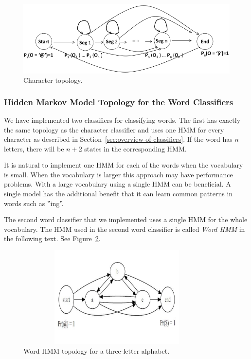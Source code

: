 \begin{figure}[h!]
\centering
\includegraphics[scale=1.1]{character-topology}
\caption{Character topology.}
\label{figure:charactertopology}
\end{figure}


\subsubsection{Hidden Markov Model Topology for the Word Classifiers}

We have implemented two classifiers for classifying words. 
The first has exactly the same topology as the character classifier and uses one HMM for every character as described in Section~\ref{sec:overview-of-classifiers}. 
If the word has $n$ letters, there will be $n + 2$ states in the corresponding HMM.

It is natural to implement one HMM for each of the words when the vocabulary is small.
When the vocabulary is larger this approach may have performance problems.
With a large vocabulary using a single HMM can be beneficial.
A single model has the additional benefit that it can learn common patterns in words such as ''ing''.

The second word classifier that we implemented uses a single HMM for the whole vocabulary. 
The HMM used in the second word classifier is called \textit{Word HMM} in the following text.
See Figure~\ref{figure:wordtopology}.

\begin{figure}[h!]
\centering
\includegraphics[width=4in,height=2in]{wordtopology}
\caption{Word HMM topology for a three-letter alphabet.}
\label{figure:wordtopology}
\end{figure}

